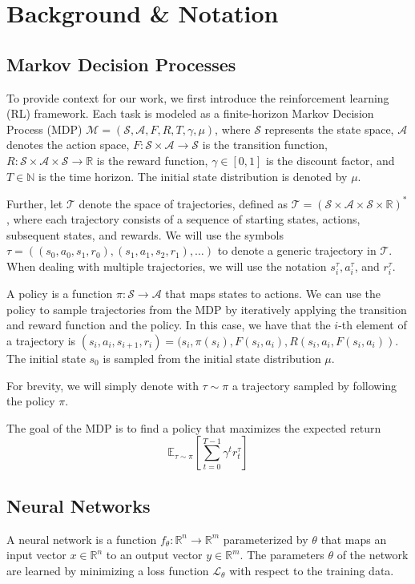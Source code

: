 \section{Background \& Notation}\label{sect:background}

\subsection{Markov Decision Processes}
To provide context for our work, we first introduce the reinforcement learning (RL) framework. Each task is modeled as a finite-horizon Markov Decision Process (MDP) $\mathcal{M} = (\mathcal{S}, \mathcal{A}, F, R, T, \gamma, \mu)$, where $\mathcal{S}$ represents the state space, $\mathcal{A}$ denotes the action space, $F:\mathcal{S} \times \mathcal{A} \rightarrow \mathcal{S}$ is the transition function, $R:\mathcal{S} \times \mathcal{A} \times \mathcal{S} \rightarrow \mathbb{R}$ is the reward function, $\gamma \in [0, 1]$ is the discount factor, and $T \in \mathbb{N}$ is the time horizon. The initial state distribution is denoted by $\mu$.

Further, let $\mathcal{T}$ denote the space of trajectories, defined as $\mathcal{T} = (\mathcal{S} \times \mathcal{A} \times \mathcal{S} \times \mathbb{R})^*$, where each trajectory consists of a sequence of starting states, actions, subsequent states, and rewards. We will use the symbols $\tau=((s_0, a_0, s_1, r_0), (s_1, a_1, s_2, r_1), \ldots)$ to denote a generic trajectory in $\mathcal{T}$. When dealing with multiple trajectories, we will use the notation $s_i^\tau, a_i^\tau$, and $r_i^\tau$.

A policy is a function $\pi:\mathcal{S}\rightarrow\mathcal{A}$ that maps states to actions. We can use the policy to sample trajectories from the MDP by iteratively applying the transition and reward function and the policy. In this case, we have that the $i$-th element of a trajectory is $(s_i, a_i, s_{i+1}, r_i) = (s_i, \pi(s_i), F(s_i, a_i), R(s_i,a_i,F(s_i, a_i))$. The initial state $s_0$ is sampled from the initial state distribution $\mu$.

For brevity, we will simply denote with $\tau\sim\pi$ a trajectory sampled by following the policy $\pi$.

The goal of the MDP is to find a policy that maximizes the expected return 
$$\mathbb{E}_{\tau\sim\pi}\left[\sum_{t=0}^{T-1}\gamma^t r_t^\tau \right]$$

\subsection{Neural Networks}
A neural network is a function $f_{\theta}:\mathbb{R}^n\rightarrow\mathbb{R}^m$ parameterized by $\theta$ that maps an input vector $x\in\mathbb{R}^n$ to an output vector $y\in\mathbb{R}^m$. The parameters $\theta$ of the network are learned by minimizing a loss function $\mathcal{L}_\theta$ with respect to the training data.

